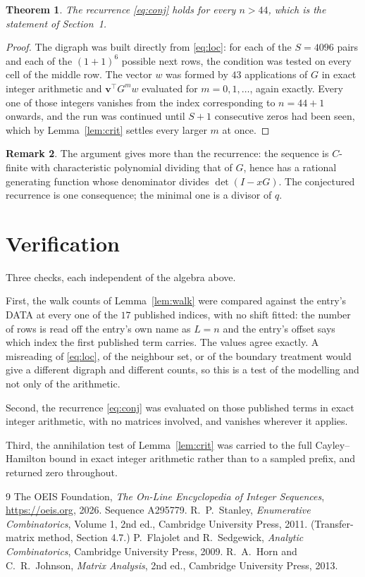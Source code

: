 \documentclass[11pt,a4paper]{article}
\theoremstyle{plain}
\newtheorem{theorem}{Theorem}
\theoremstyle{definition}
\newtheorem{remark}[theorem]{Remark}
\begin{document}
\begin{theorem}
The recurrence \eqref{eq:conj} holds for every $n>44$, which is the statement of
Section~1.
\end{theorem}

\begin{proof}
The digraph was built directly from \eqref{eq:loc}: for each of the $S=4096$ pairs and each
of the $(1+1)^{6}$ possible next rows, the condition was tested on every cell of
the middle row. The vector $w$ was formed by $43$ applications of $G$ in exact integer
arithmetic and $\mathbf{v}^{\!\top}G^{m}w$ evaluated for $m=0,1,\dots$, again exactly.
Every one of those integers vanishes from the index corresponding to $n=44+1$ onwards,
and the run was continued until $S+1$ consecutive zeros had been seen, which by
Lemma~\ref{lem:crit} settles every larger $m$ at once.
\end{proof}

\begin{remark}
The argument gives more than the recurrence: the sequence is $C$-finite with characteristic
polynomial dividing that of $G$, hence has a rational generating function whose denominator
divides $\det(I-xG)$. The conjectured recurrence is one consequence; the minimal one is a
divisor of $q$.
\end{remark}

\section{Verification}

Three checks, each independent of the algebra above.

First, the walk counts of Lemma~\ref{lem:walk} were compared against the entry's DATA at
every one of the $17$ published indices, with no shift fitted: the number of rows is
read off the entry's own name as $L=n$ and the entry's offset says which index the first
published term carries. The values agree exactly. A misreading of \eqref{eq:loc}, of the
neighbour set, or of the boundary treatment would give a different digraph and different
counts, so this is a test of the modelling and not only of the arithmetic.

Second, the recurrence \eqref{eq:conj} was evaluated on those published terms in exact
integer arithmetic, with no matrices involved, and vanishes wherever it applies.

Third, the annihilation test of Lemma~\ref{lem:crit} was carried to the full
Cayley--Hamilton bound in exact integer arithmetic rather than to a sampled prefix, and
returned zero throughout.

\begin{thebibliography}{9}
 The OEIS Foundation, \emph{The On-Line Encyclopedia of Integer
Sequences}, \url{https://oeis.org}, 2026. Sequence A295779.
 R.~P.~Stanley, \emph{Enumerative Combinatorics}, Volume 1, 2nd ed.,
Cambridge University Press, 2011. (Transfer-matrix method, Section 4.7.)
 P.~Flajolet and R.~Sedgewick, \emph{Analytic Combinatorics}, Cambridge
University Press, 2009.
 R.~A.~Horn and C.~R.~Johnson, \emph{Matrix Analysis}, 2nd ed., Cambridge
University Press, 2013.
\end{thebibliography}
\end{document}
